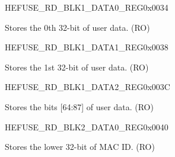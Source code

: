 \begin{register}{H}{EFUSE\_RD\_BLK1\_DATA0\_REG}{0x0034}\label{regdesc:EFUSERDBLK1DATA0REG}
%
\regnewline%
\begin{regdesc}\begin{reglist}
\label{fielddesc:EFUSESYSTEMDATA0}\item [EFUSE\_USER\_DATA0] Stores the 0th 32-bit of user data. (RO)
\end{reglist}\end{regdesc}
\end{register}


\begin{register}{H}{EFUSE\_RD\_BLK1\_DATA1\_REG}{0x0038}\label{regdesc:EFUSERDBLK1DATA1REG}
%
\regnewline%
\begin{regdesc}\begin{reglist}
\label{fielddesc:EFUSESYSTEMDATA1}\item [EFUSE\_USER\_DATA1] Stores the 1st 32-bit of user data. (RO)
\end{reglist}\end{regdesc}
\end{register}


\begin{register}{H}{EFUSE\_RD\_BLK1\_DATA2\_REG}{0x003C}\label{regdesc:EFUSERDBLK1DATA2REG}
%
%
\regnewline%
\begin{regdesc}\begin{reglist}
\label{fielddesc:EFUSESYSTEMDATA2}\item [EFUSE\_USER\_DATA2] Stores the bits [64:87] of user data. (RO)
\end{reglist}\end{regdesc}
\end{register}


\begin{register}{H}{EFUSE\_RD\_BLK2\_DATA0\_REG}{0x0040}\label{regdesc:EFUSERDBLK2DATA0REG}
%
\regnewline%
\begin{regdesc}\begin{reglist}
\label{fielddesc:EFUSEMACIDLOW}\item [EFUSE\_MAC\_ID\_LOW] Stores the lower 32-bit of MAC ID. (RO)
\end{reglist}\end{regdesc}
\end{register}


